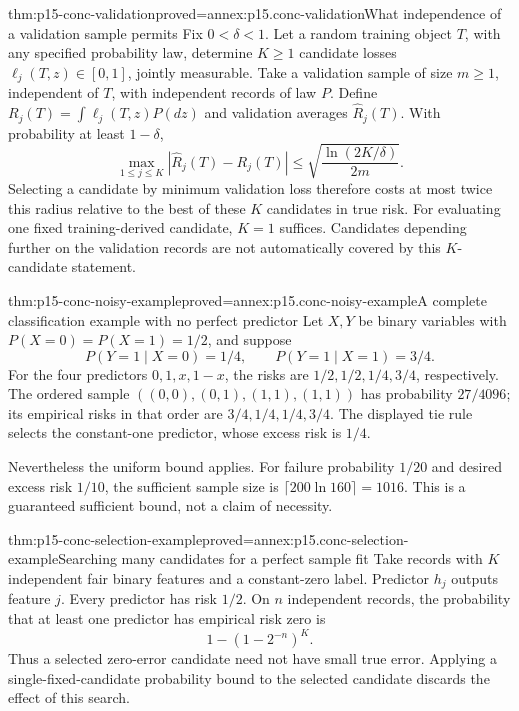 \begin{hbtheorem}{thm:p15-conc-validation}{proved=annex:p15.conc-validation}{What independence of a validation sample permits}
Fix \(0<\delta<1\). Let a random training object \(T\), with any specified probability
law, determine \(K\geq1\) candidate losses
\(\ell_j(T,z)\in[0,1]\), jointly measurable.
Take a validation sample of size \(m\geq1\), independent of \(T\),
with independent records of law \(P\).
Define \(R_j(T)=\int\ell_j(T,z)P(dz)\) and validation averages
\(\widehat R_j(T)\). With probability at least \(1-\delta\),
\[
 \max_{1\leq j\leq K}|\widehat R_j(T)-R_j(T)|
                \leq\sqrt{\frac{\ln(2K/\delta)}{2m}}.
\]
Selecting a candidate by minimum validation loss therefore
costs at most twice this radius relative to the best of these
\(K\) candidates in true risk. For evaluating one fixed
training-derived candidate, \(K=1\) suffices.
Candidates depending further on the validation records are
not automatically covered by this \(K\)-candidate statement.
\end{hbtheorem}

\begin{hbtheorem}{thm:p15-conc-noisy-example}{proved=annex:p15.conc-noisy-example}{A complete classification example with no perfect predictor}
Let \(X,Y\) be binary variables with \(P(X=0)=P(X=1)=1/2\), and suppose
\[
       P(Y=1\mid X=0)=1/4,\qquad P(Y=1\mid X=1)=3/4.
\]
For the four predictors \(0,1,x,1-x\), the risks are
\(1/2,1/2,1/4,3/4\), respectively.
The ordered sample
\(((0,0),(0,1),(1,1),(1,1))\) has probability \(27/4096\);
its empirical risks in that order are \(3/4,1/4,1/4,3/4\).
The displayed tie rule selects the constant-one predictor,
whose excess risk is \(1/4\).

Nevertheless the uniform bound applies. For failure probability
\(1/20\) and desired excess risk \(1/10\), the sufficient sample
size is \(\lceil200\ln160\rceil=1016\).
This is a guaranteed sufficient bound, not a claim of necessity.
\end{hbtheorem}

\begin{hbtheorem}{thm:p15-conc-selection-example}{proved=annex:p15.conc-selection-example}{Searching many candidates for a perfect sample fit}
Take records with \(K\) independent fair binary features and a
constant-zero label. Predictor \(h_j\) outputs feature \(j\).
Every predictor has risk \(1/2\). On \(n\) independent records,
the probability that at least one predictor has empirical risk zero is
\[
                          1-(1-2^{-n})^K.
\]
Thus a selected zero-error candidate need not have small true error.
Applying a single-fixed-candidate probability bound to the selected
candidate discards the effect of this search.
\end{hbtheorem}

